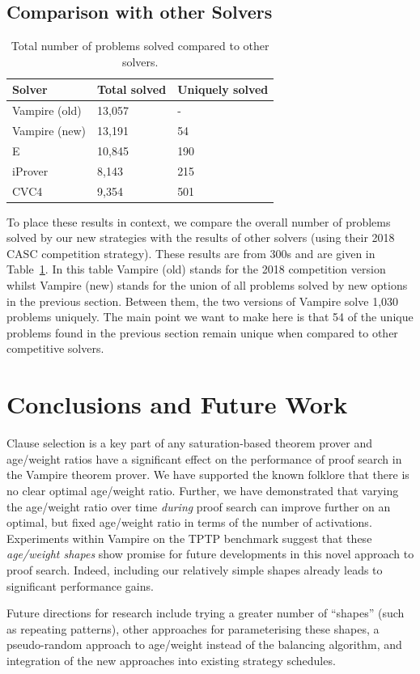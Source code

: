 \documentclass{llncs}
\begin{document}
\subsection{Comparison with other Solvers}

\begin{table}[t]
\caption{Total number of problems solved compared to other solvers.\label{tab:other}}
\centering
\begin{tabular}{l|l|l}
Solver 		& Total solved & Uniquely solved \\ \hline
Vampire (old)	& 13,057 & -\\
Vampire (new)   & 13,191 & 54\\
E 			&10,845 & 190\\
iProver		& 8,143 & 215\\
CVC4		& 9,354 & 501\\
\end{tabular}
\end{table}

To place these results in context, we compare the overall number of problems solved by our new strategies with the results of other solvers (using their 2018 CASC competition strategy). These results are from 300s and are given in Table~\ref{tab:other}. In this table Vampire (old) stands for the 2018 competition version whilst Vampire (new) stands for the union of all problems solved by new options in the previous section. Between them, the two versions of Vampire solve 1,030 problems uniquely. The main point we want to make here is that 54 of the unique problems found in the previous section remain unique when compared to other competitive solvers.

\section{Conclusions and Future Work}
\label{sec:conclusions}

Clause selection is a key part of any saturation-based theorem prover and age/weight ratios have a significant effect on the performance of proof search in the Vampire theorem prover. We have supported the known folklore that there is no clear optimal age/weight ratio.
Further, we have demonstrated that varying the age/weight ratio over time \emph{during} proof search can improve further on an optimal, but fixed age/weight ratio in terms of the number of activations.
Experiments within Vampire on the TPTP benchmark suggest that these \emph{age/weight shapes} show promise for future developments in this novel approach to proof search. Indeed, including our relatively simple shapes already leads to significant performance gains.

Future directions for research include trying a greater number of ``shapes'' (such as repeating patterns), other approaches for parameterising these shapes, a pseudo-random approach to age/weight instead of the balancing algorithm, and integration of the new approaches into existing strategy schedules.


\end{document}
